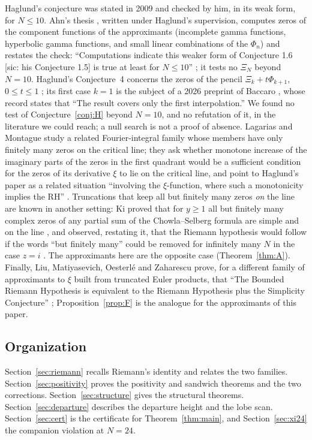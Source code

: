 \documentclass[11pt]{article}
\theoremstyle{plain}
\theoremstyle{definition}
\theoremstyle{remark}
\begin{document}
Haglund's conjecture was stated in 2009 \cite{Hag, HagJ} and checked by him, in
its weak form, for $N \le 10$. Ahn's thesis \cite{Ahn}, written under Haglund's
supervision, computes zeros of the component functions of the approximants
(incomplete gamma functions, hyperbolic gamma functions, and small linear
combinations of the $\Phi_n$) and restates the check: ``Computations indicate
this weaker form of Conjecture 1.6 [sic: his Conjecture 1.5] is true at least for $N \le 10$''
\cite[pp.~10--11]{Ahn}; it tests no $\Xi_N$ beyond $N = 10$. Haglund's Conjecture~4
concerns the zeros of the pencil $\Xi_k + t\Phi_{k+1}$, $0 \le t \le 1$
\cite[p.~11]{Hag}; its first case $k = 1$ is the subject of a 2026 preprint of
Baccaro \cite{Bac}, whose record states that ``The result covers only the first
interpolation.'' We found no test of Conjecture~\ref{conj:H} beyond $N = 10$, and
no refutation of it, in the literature we could reach; a null search is not a
proof of absence. Lagarias and Montague study a related Fourier-integral family
whose members have only finitely many zeros on the critical line; they ask
whether monotone increase of the imaginary parts of the zeros in the first
quadrant would be a sufficient condition for the zeros of its derivative $\xi$ to
lie on the critical line, and point to Haglund's paper as a related situation ``involving the $\xi$-function,
where such a monotonicity implies the RH'' \cite[p.~24]{LM}. Truncations that keep
all but finitely many zeros \emph{on} the line are known in another setting: Ki
proved that for $y \ge 1$ all but finitely many complex zeros of any partial sum
of the Chowla--Selberg formula are simple and on the line \cite[Corollary~1]{KiP}, and
observed, restating it, that the Riemann hypothesis would follow if the words ``but finitely many'' could be
removed for infinitely many $N$ in the case $z = i$ \cite[p.~198]{Ki}. The
approximants here are the opposite case (Theorem~\ref{thm:A}). Finally,
Liu, Matiyasevich, Oesterl\'e and Zaharescu prove, for a different family of
approximants to $\xi$ built from truncated Euler products, that ``The Bounded
Riemann Hypothesis is equivalent to the Riemann Hypothesis plus the Simplicity
Conjecture'' \cite[Theorem~1.7]{LMOZ}; Proposition~\ref{prop:F} is the analogue
for the approximants of this paper.

\subsection{Organization}

Section~\ref{sec:riemann} recalls Riemann's identity and relates the two
families. Section~\ref{sec:positivity} proves the positivity and sandwich
theorems and the two corrections. Section~\ref{sec:structure} gives the
structural theorems. Section~\ref{sec:departure} describes the departure height
and the lobe scan. Section~\ref{sec:cert} is the certificate for
Theorem~\ref{thm:main}, and Section~\ref{sec:xi24} the companion violation at
$N = 24$.
\end{document}
